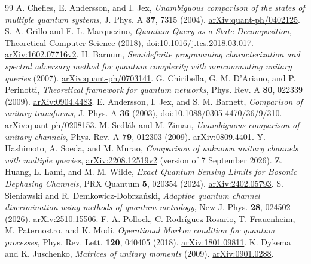 \documentclass[11pt,a4paper]{article}
\theoremstyle{remark}
\begin{document}
\begin{thebibliography}{99}
A. Chefles, E. Andersson, and I. Jex,
\emph{Unambiguous comparison of the states of multiple quantum systems},
J. Phys. A \textbf{37}, 7315 (2004).
\href{https://arxiv.org/abs/quant-ph/0402125}{arXiv:quant-ph/0402125}.
S. A. Grillo and F. L. Marquezino,
\emph{Quantum Query as a State Decomposition},
Theoretical Computer Science (2018),
\href{https://doi.org/10.1016/j.tcs.2018.03.017}{doi:10.1016/j.tcs.2018.03.017}.
\href{https://arxiv.org/abs/1602.07716v2}{arXiv:1602.07716v2}.
H. Barnum,
\emph{Semidefinite programming characterization and spectral adversary
method for quantum complexity with noncommuting unitary queries} (2007).
\href{https://arxiv.org/abs/quant-ph/0703141}{arXiv:quant-ph/0703141}.
G. Chiribella, G. M. D'Ariano, and P. Perinotti,
\emph{Theoretical framework for quantum networks},
Phys. Rev. A \textbf{80}, 022339 (2009).
\href{https://arxiv.org/abs/0904.4483}{arXiv:0904.4483}.
E. Andersson, I. Jex, and S. M. Barnett,
\emph{Comparison of unitary transforms},
J. Phys. A \textbf{36} (2003),
\href{https://doi.org/10.1088/0305-4470/36/9/310}{doi:10.1088/0305-4470/36/9/310}.
\href{https://arxiv.org/abs/quant-ph/0208153}{arXiv:quant-ph/0208153}.
M. Sedl\'ak and M. Ziman,
\emph{Unambiguous comparison of unitary channels},
Phys. Rev. A \textbf{79}, 012303 (2009).
\href{https://arxiv.org/abs/0809.4401}{arXiv:0809.4401}.
Y. Hashimoto, A. Soeda, and M. Murao,
\emph{Comparison of unknown unitary channels with multiple queries},
\href{https://arxiv.org/abs/2208.12519v2}{arXiv:2208.12519v2}
(version of 7 September 2026).
Z. Huang, L. Lami, and M. M. Wilde,
\emph{Exact Quantum Sensing Limits for Bosonic Dephasing Channels},
PRX Quantum \textbf{5}, 020354 (2024).
\href{https://arxiv.org/abs/2402.05793}{arXiv:2402.05793}.
S. Sieniawski and R. Demkowicz-Dobrza\'nski,
\emph{Adaptive quantum channel discrimination using methods of quantum
metrology}, New J. Phys. \textbf{28}, 024502 (2026).
\href{https://arxiv.org/abs/2510.15506}{arXiv:2510.15506}.
F. A. Pollock, C. Rodr\'iguez-Rosario, T. Frauenheim,
M. Paternostro, and K. Modi,
\emph{Operational Markov condition for quantum processes},
Phys. Rev. Lett. \textbf{120}, 040405 (2018).
\href{https://arxiv.org/abs/1801.09811}{arXiv:1801.09811}.
K. Dykema and K. Juschenko,
\emph{Matrices of unitary moments} (2009).
\href{https://arxiv.org/abs/0901.0288}{arXiv:0901.0288}.

\end{thebibliography}
\end{document}

